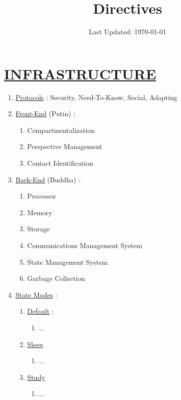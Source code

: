 \documentclass[11pt]{article}
\title{	
	\normalfont \normalsize 
	\huge Directives
}
\date{Last Updated: \normalsize\today}
\begin{document}
\maketitle
\section*{\ul{INFRASTRUCTURE}}
\begin{enumerate}
	\item[] \ul{Protocols} : Security, Need-To-Know, Social, Adapting
	
	\item[] \ul{Front-End} (Putin) :
	\begin{enumerate}
		\item[] Compartmentalization
		\item[] Perspective Management
		\item[] Contact Identification
	\end{enumerate}

	\item[] \ul{Back-End} (Buddha) :
	\begin{enumerate}
		\item[] Processor
		\item[] Memory
		\item[] Storage
		\item[] Communications Management System
		\item[] State Management System
		\item[] Garbage Collection
	\end{enumerate}

	\item[] \ul{State Modes} :
	\begin{enumerate}
		\item[] \ul{Default} :
		\begin{enumerate}
			\item[] ...
		\end{enumerate}
	
		\item[] \ul{Sleep}
		\begin{enumerate}
			\item[] ...
		\end{enumerate}

		\item[] \ul{Study}
		\begin{enumerate}
			\item[] ...
		\end{enumerate}
	

\end{enumerate}
\end{enumerate}
\end{document}
